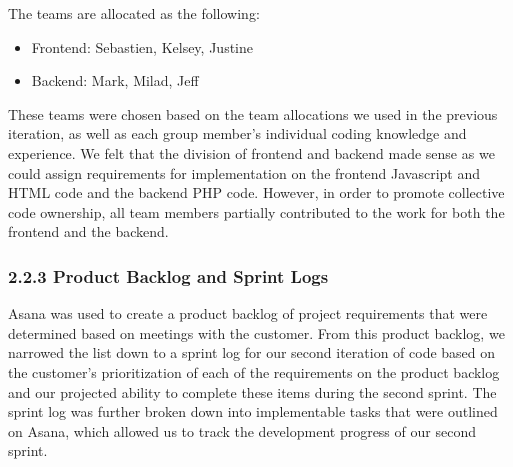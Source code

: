 \documentclass[]{article}
\begin{document}
The teams are allocated as the following:

\begin{itemize}
\itemsep1pt\parskip0pt
\item
  Frontend: Sebastien, Kelsey, Justine
\item
  Backend: Mark, Milad, Jeff
\end{itemize}

These teams were chosen based on the team allocations we used in the
previous iteration, as well as each group member's individual coding
knowledge and experience. We felt that the division of frontend and
backend made sense as we could assign requirements for implementation on
the frontend Javascript and HTML code and the backend PHP code. However,
in order to promote collective code ownership, all team members
partially contributed to the work for both the frontend and the backend.

\subsubsection{2.2.3 Product Backlog and Sprint
Logs}\label{product-backlog-and-sprint-logs}

Asana was used to create a product backlog of project requirements that
were determined based on meetings with the customer. From this product
backlog, we narrowed the list down to a sprint log for our second
iteration of code based on the customer's prioritization of each of the
requirements on the product backlog and our projected ability to
complete these items during the second sprint. The sprint log was
further broken down into implementable tasks that were outlined on
Asana, which allowed us to track the development progress of our second
sprint.
\end{document}
